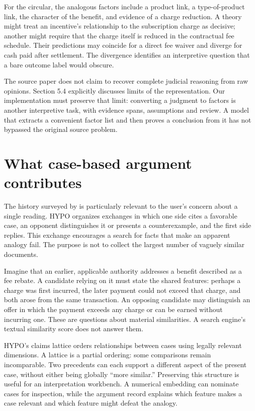 For the circular, the analogous factors include a product link, a type-of-product
link, the character of the benefit, and evidence of a charge reduction. A theory
might treat an incentive's relationship to the subscription charge as decisive;
another might require that the charge itself is reduced in the contractual fee
schedule. Their predictions may coincide for a direct fee waiver and diverge for
cash paid after settlement. The divergence identifies an interpretive question
that a bare outcome label would obscure.

The source paper does not claim to recover complete judicial reasoning from raw
opinions. Section 5.4 explicitly discusses limits of the representation. Our
implementation must preserve that limit: converting a judgment to factors is
another interpretive task, with evidence spans, assumptions and review. A model
that extracts a convenient factor list and then proves a conclusion from it has
not bypassed the original source problem.

\section{What case-based argument contributes}
\label{merge:M05:02}


The history surveyed by \citet[sections 2--3]{hypolegacy2017} is particularly
relevant to the user's concern about a single reading. HYPO organizes exchanges
in which one side cites a favorable case, an opponent distinguishes it or presents
a counterexample, and the first side replies. This exchange encourages a search
for facts that make an apparent analogy fail. The purpose is not to collect the
largest number of vaguely similar documents.

Imagine that an earlier, applicable authority addresses a benefit described as a
fee rebate. A candidate relying on it must state the shared features: perhaps a
charge was first incurred, the later payment could not exceed that charge, and
both arose from the same transaction. An opposing candidate may distinguish an
offer in which the payment exceeds any charge or can be earned without incurring
one. These are questions about material similarities. A search engine's textual
similarity score does not answer them.

HYPO's claims lattice orders relationships between cases using legally relevant
dimensions. A lattice is a partial ordering: some comparisons remain
incomparable. Two precedents can each support a different aspect of the present
case, without either being globally ``more similar.'' Preserving this structure
is useful for an interpretation workbench. A numerical embedding can nominate
cases for inspection, while the argument record explains which feature makes a
case relevant and which feature might defeat the analogy.

